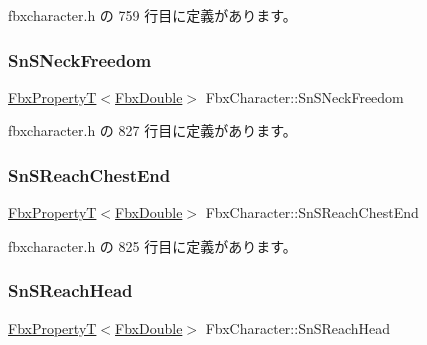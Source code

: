  fbxcharacter.\+h の 759 行目に定義があります。

\mbox{\label{class_fbx_character_abbba368e4fd1c169d32f835a6a4dc41d}} 
\subsubsection{\texorpdfstring{Sn\+S\+Neck\+Freedom}{SnSNeckFreedom}}
{\footnotesize\ttfamily \hyperlink{class_fbx_property_t}{Fbx\+PropertyT}$<$\hyperlink{fbxtypes_8h_a171e72a1c46fc15c1a6c9c31948c1c5b}{Fbx\+Double}$>$ Fbx\+Character\+::\+Sn\+S\+Neck\+Freedom}



 fbxcharacter.\+h の 827 行目に定義があります。

\mbox{\label{class_fbx_character_a36b24849b40afbde11e78d79425b2e78}} 
\subsubsection{\texorpdfstring{Sn\+S\+Reach\+Chest\+End}{SnSReachChestEnd}}
{\footnotesize\ttfamily \hyperlink{class_fbx_property_t}{Fbx\+PropertyT}$<$\hyperlink{fbxtypes_8h_a171e72a1c46fc15c1a6c9c31948c1c5b}{Fbx\+Double}$>$ Fbx\+Character\+::\+Sn\+S\+Reach\+Chest\+End}



 fbxcharacter.\+h の 825 行目に定義があります。

\mbox{\label{class_fbx_character_ad880ff31b2b21f37ab5f8a8794fde78d}} 
\subsubsection{\texorpdfstring{Sn\+S\+Reach\+Head}{SnSReachHead}}
{\footnotesize\ttfamily \hyperlink{class_fbx_property_t}{Fbx\+PropertyT}$<$\hyperlink{fbxtypes_8h_a171e72a1c46fc15c1a6c9c31948c1c5b}{Fbx\+Double}$>$ Fbx\+Character\+::\+Sn\+S\+Reach\+Head}



